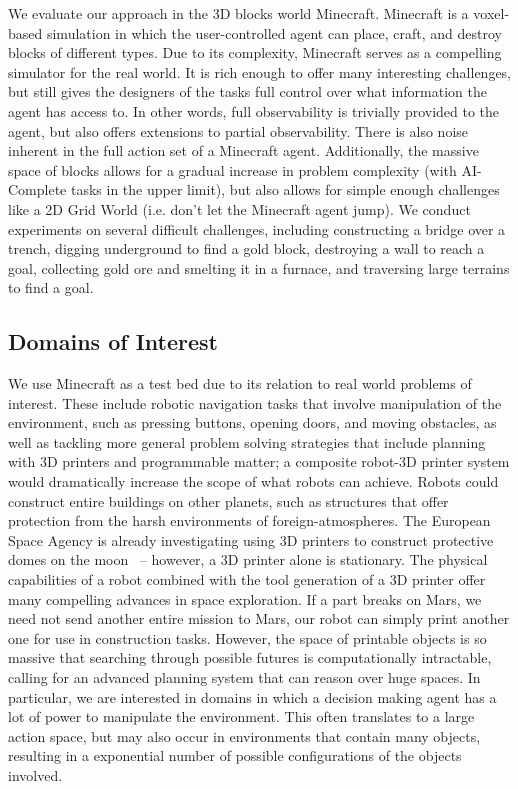 \documentclass[11pt]{article}
\begin{document}
We evaluate our approach in the 3D blocks world Minecraft. Minecraft is a voxel-based simulation in which the user-controlled agent can place, craft, and destroy blocks of different types. Due to its complexity, Minecraft serves as a compelling simulator for the real world. It is rich enough to offer many interesting challenges, but still gives the designers of the tasks full control over what information the agent has access to. In other words, full observability is trivially provided to the agent, but also offers extensions to partial observability. There is also noise inherent in the full action set of a Minecraft agent. Additionally, the massive space of blocks allows for a gradual increase in problem complexity (with AI-Complete tasks in the upper limit), but also allows for simple enough challenges like a 2D Grid World (i.e. don't let the Minecraft agent jump). We conduct experiments on several difficult challenges, including constructing a bridge over a trench, digging underground to find a gold block, destroying a wall to reach a goal, collecting gold ore and smelting it in a furnace, and traversing large terrains to find a goal.


\subsection{Domains of Interest}
We use Minecraft as a test bed due to its relation to real world problems of interest. These include robotic navigation tasks that involve manipulation of the environment, such as pressing buttons, opening doors, and moving obstacles, as well as tackling more general problem solving strategies that include planning with 3D printers and programmable matter; a composite robot-3D printer system would dramatically increase the scope of what robots can achieve. Robots could construct entire buildings on other planets, such as structures that offer protection from the harsh environments of foreign-atmospheres. The European Space Agency is already investigating using 3D printers to construct protective domes on the moon~\cite{ceccanti20103D,Cesaretti2014430} -- however, a 3D printer alone is stationary. The physical capabilities of a robot combined with the tool generation of a 3D printer offer many compelling advances in space exploration. If a part breaks on Mars, we need not send another entire mission to Mars, our robot can simply print another one for use in construction tasks. However, the space of printable objects is so massive that searching through possible futures is computationally intractable, calling for an advanced planning system that can reason over huge spaces. In particular, we are interested in domains in which a decision making agent has a lot of power to manipulate the environment. This often translates to a large action space, but may also occur in environments that contain many objects, resulting in a exponential number of possible configurations of the objects involved.
\end{document}
